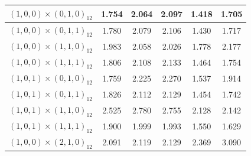 \begin{enumerate}[label=\alph*.]
\begin{longtable}{|c|c|c|c|c|c|}
        {$(1,0,0) \times (0,1,0)_{12}$} & 1.754 & 2.064 & 2.097 & 1.418 & 1.705 \\ \hline
        {$(1,0,0) \times (0,1,1)_{12}$} & 1.780 & 2.079 & 2.106 & 1.430 & 1.717 \\ \hline
        {$(1,0,0) \times (1,1,0)_{12}$} & 1.983 & 2.058 & 2.026 & 1.778 & 2.177 \\ \hline
        {$(1,0,0) \times (1,1,1)_{12}$} & 1.806 & 2.108 & 2.133 & 1.464 & 1.754 \\ \hline

        {$(1,0,1) \times (0,1,0)_{12}$} & 1.759 & 2.225 & 2.270 & 1.537 & 1.914 \\ \hline
        {$(1,0,1) \times (0,1,1)_{12}$} & 1.826 & 2.112 & 2.129 & 1.454 & 1.742 \\ \hline
        {$(1,0,1) \times (1,1,0)_{12}$} & 2.525 & 2.780 & 2.755 & 2.128 & 2.142 \\ \hline
        {$(1,0,1) \times (1,1,1)_{12}$} & 1.900 & 1.999 & 1.993 & 1.550 & 1.629 \\ \hline

        {$(1,0,0) \times (2,1,0)_{12}$} & 2.091 & 2.119 & 2.129 & 2.369 & 3.090 \\ \hline

    \end{longtable}
\end{enumerate}